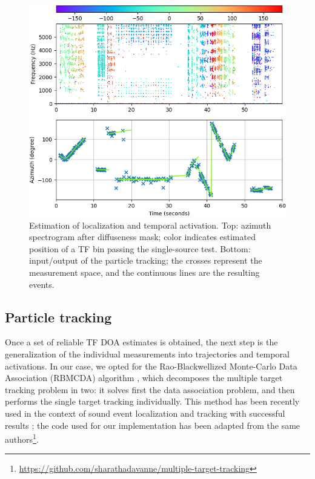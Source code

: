 \begin{figure}[th!]
  \centering
  \centerline{\includegraphics[width=\columnwidth]{Figures/SELD/plots.png}}
  \caption{Estimation of localization and temporal activation. Top: azimuth spectrogram after diffuseness mask; color indicates estimated position of a TF bin passing the single-source test. Bottom: input/output of the particle tracking; the crosses represent the measurement space, and the continuous lines are the resulting events.}
  \label{fig:plots}
\end{figure}

 

\subsection{Particle tracking}

Once a set of reliable TF DOA estimates is obtained, the next step is the generalization of the individual measurements into trajectories and temporal activations.
In our case, we opted for the Rao-Blackwellized Monte-Carlo Data Association (RBMCDA) algorithm \cite{sarkka2004rao}, which decomposes the multiple target tracking problem in two: it solves first the data association problem, and then performs the single target tracking individually. 
This method has been recently used in the context of sound event localization and tracking with successful results \cite{Adavanne2018_JSTSP, adavanne2019localization}; the code used for our implementation has been adapted from the same authors\footnote{\url{https://github.com/sharathadavanne/multiple-target-tracking}}.


